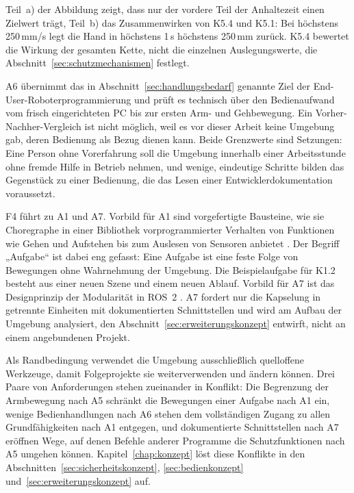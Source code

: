 Teil~a) der Abbildung zeigt, dass nur der vordere Teil der Anhaltezeit einen Zielwert trägt, Teil~b) das Zusammenwirken von K5.4 und K5.1: Bei höchstens 250\,mm/s legt die Hand in höchstens 1\,s höchstens 250\,mm zurück.
K5.4 bewertet die Wirkung der gesamten Kette, nicht die einzelnen Auslegungswerte, die Abschnitt~\ref{sec:schutzmechanismen} festlegt.

A6 übernimmt das in Abschnitt~\ref{sec:handlungsbedarf} genannte Ziel der End-User-Roboterprogrammierung und prüft es technisch über den Bedienaufwand vom frisch eingerichteten PC bis zur ersten Arm- und Gehbewegung.
Ein Vorher-Nachher-Vergleich ist nicht möglich, weil es vor dieser Arbeit keine Umgebung gab, deren Bedienung als Bezug dienen kann.
Beide Grenzwerte sind Setzungen: Eine Person ohne Vorerfahrung soll die Umgebung innerhalb einer Arbeitsstunde ohne fremde Hilfe in Betrieb nehmen, und wenige, eindeutige Schritte bilden das Gegenstück zu einer Bedienung, die das Lesen einer Entwicklerdokumentation voraussetzt.

F4 führt zu A1 und A7.
Vorbild für A1 sind vorgefertigte Bausteine, wie sie Choregraphe in einer Bibliothek vorprogrammierter Verhalten von Funktionen wie Gehen und Aufstehen bis zum Auslesen von Sensoren anbietet \cite{Pot2009}.
Der Begriff „Aufgabe“ ist dabei eng gefasst: Eine Aufgabe ist eine feste Folge von Bewegungen ohne Wahrnehmung der Umgebung. Die Beispielaufgabe für K1.2 besteht aus einer neuen Szene und einem neuen Ablauf.
Vorbild für A7 ist das Designprinzip der Modularität in ROS~2 \cite{Macenski2022}.
A7 fordert nur die Kapselung in getrennte Einheiten mit dokumentierten Schnittstellen und wird am Aufbau der Umgebung analysiert, den Abschnitt~\ref{sec:erweiterungskonzept} entwirft, nicht an einem angebundenen Projekt.

Als Randbedingung verwendet die Umgebung ausschließlich quelloffene Werkzeuge, damit Folgeprojekte sie weiterverwenden und ändern können.
Drei Paare von Anforderungen stehen zueinander in Konflikt: Die Begrenzung der Armbewegung nach A5 schränkt die Bewegungen einer Aufgabe nach A1 ein, wenige Bedienhandlungen nach A6 stehen dem vollständigen Zugang zu allen Grundfähigkeiten nach A1 entgegen, und dokumentierte Schnittstellen nach A7 eröffnen Wege, auf denen Befehle anderer Programme die Schutzfunktionen nach A5 umgehen können.
Kapitel~\ref{chap:konzept} löst diese Konflikte in den Abschnitten~\ref{sec:sicherheitskonzept}, \ref{sec:bedienkonzept} und~\ref{sec:erweiterungskonzept} auf.

